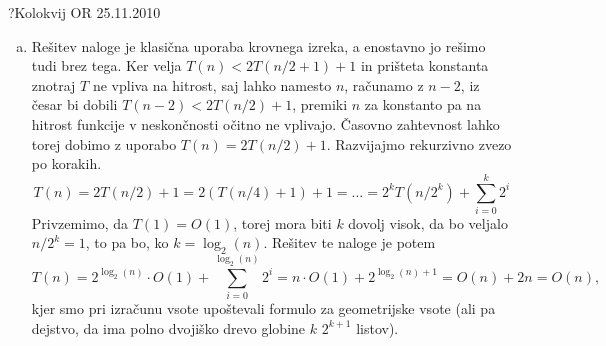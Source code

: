 \begin{naloga}{?}{Kolokvij OR 25.11.2010}
\begin{odgovor}
\begin{enumerate}[(a)]
\item Rešitev naloge je klasična uporaba krovnega izreka, a enostavno jo rešimo tudi brez tega.
Ker velja $T(n) < 2T(n/2 + 1) + 1$ in prišteta konstanta znotraj $T$ ne vpliva na hitrost, 
saj lahko namesto $n$, računamo z $n - 2$, iz česar bi dobili $T(n - 2) < 2T(n/2) + 1$, 
premiki $n$ za konstanto pa na hitrost funkcije v neskončnosti očitno ne vplivajo.
Časovno zahtevnost lahko torej dobimo z uporabo $T(n) = 2T(n/2) + 1$.
Razvijajmo rekurzivno zvezo po korakih.
$$T(n) = 2T(n/2) + 1 = 2 (T(n/4) + 1) + 1 = \dots = 2^k T\left(n / 2^k\right) + \sum_{i=0}^{k} 2^i$$
Privzemimo, da $T(1) = O(1)$, torej mora biti $k$ dovolj visok, da bo veljalo
$n / 2^k = 1$, to pa bo, ko $k = \log_2(n)$.
Rešitev te naloge je potem
$$T(n) = 2^{\log_2(n)} \cdot O(1) + \sum_{i=0}^{\log_2(n)} 2^i = n \cdot O(1) + 2^{\log_2(n) + 1} = O(n) + 2n = O(n),$$
kjer smo pri izračunu vsote upoštevali formulo za geometrijske vsote 
(ali pa dejstvo, da ima polno dvojiško drevo globine $k$ $2^{k+1}$ listov).

\end{enumerate}
\end{odgovor}
\end{naloga}

